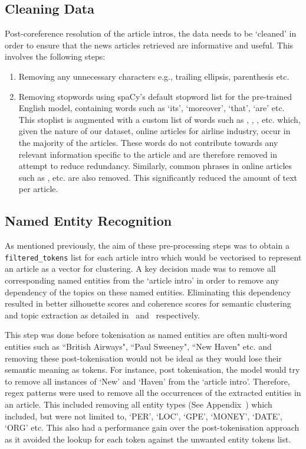 \subsection{Cleaning Data} \label{data_cleaning}
Post-coreference resolution of the article intros, the data needs to be `cleaned' in order to ensure that the news articles retrieved are informative and useful. This involves the following steps: 
\begin{enumerate}
    \item Removing any unnecessary characters e.g., trailing ellipsis, parenthesis etc.
    \item Removing stopwords using spaCy's default stopword list for the pre-trained English model, containing words such as `its', `moreover', `that', `are' etc. This stoplist is augmented with a custom list of words such as , , ,  etc. which, given the nature of our dataset, online articles for airline industry, occur in the majority of the articles. These words do not contribute towards any relevant information specific to the article and are therefore removed in attempt to reduce redundancy. Similarly, common phrases in online articles such as ,  etc. are also removed. This significantly reduced the amount of text per article.

\end{enumerate}

\subsection{Named Entity Recognition}
As mentioned previously, the aim of these pre-processing steps was to obtain a \texttt{filtered\_tokens} list for each article intro which would be vectorised to represent an article as a vector for clustering. A key decision made was to remove all corresponding named entities from the `article intro' in order to remove any dependency of the topics on these named entities. Eliminating this dependency resulted in better silhouette scores and coherence scores for semantic clustering and topic extraction as detailed in~ and~ respectively. 

This step was done before tokenisation as named entities are often multi-word entities such as ``British Airways", ``Paul Sweeney", ``New Haven" etc. and removing these post-tokenisation would not be ideal as they would lose their semantic meaning as tokens. For instance, post tokenisation, the model would try to remove all instances of `New' and `Haven' from the `article intro'. Therefore, regex patterns were used to remove all the occurrences of the extracted entities in an article. This included removing all entity types (See Appendix~) which included, but were not limited to, `PER', `LOC', `GPE', `MONEY', `DATE', `ORG' etc. This also had a performance gain over the post-tokenisation approach as it avoided the lookup for each token against the unwanted entity tokens list.

